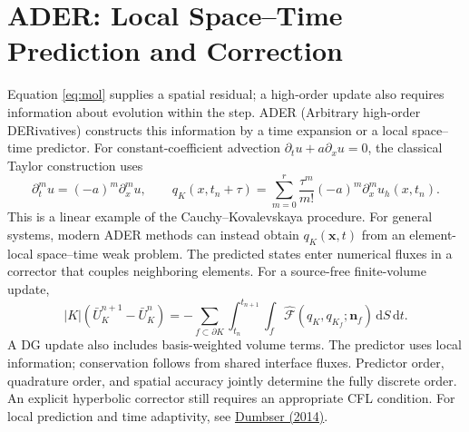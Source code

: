 \documentclass[11pt,openany]{book}
\numberwithin{equation}{chapter}
\theoremstyle{definition}
\theoremstyle{remark}
\newcommand{\dd}{\mathrm d}
\begin{document}
\section{ADER: Local Space--Time Prediction and Correction}\label{sec:ader}
Equation \eqref{eq:mol} supplies a spatial residual; a high-order update also requires information about evolution within the step.
ADER (Arbitrary high-order DERivatives) constructs this information by a time expansion or a local space--time predictor.
For constant-coefficient advection $\partial_tu+a\partial_xu=0$, the classical Taylor construction uses
\begin{equation}\label{eq:ader-taylor}
\partial_t^m u=(-a)^m\partial_x^m u,\qquad
q_K(x,t_n+\tau)=\sum_{m=0}^{r}
\frac{\tau^m}{m!}(-a)^m\partial_x^m u_h(x,t_n).
\end{equation}
This is a linear example of the Cauchy--Kovalevskaya procedure. For general systems, modern ADER methods can instead obtain $q_K(\bm x,t)$ from an element-local space--time weak problem.
The predicted states enter numerical fluxes in a corrector that couples neighboring elements.
For a source-free finite-volume update,
\begin{equation}\label{eq:ader-corrector}
|K|(\bar U_K^{n+1}-\bar U_K^n)
=-\sum_{f\subset\partial K}\int_{t_n}^{t_{n+1}}\int_f
\widehat{\mathcal F}(q_K,q_{K_f};\bm n_f)\,\dd S\,\dd t.
\end{equation}
A DG update also includes basis-weighted volume terms. The predictor uses local information; conservation follows from shared interface fluxes.
Predictor order, quadrature order, and spatial accuracy jointly determine the fully discrete order.
An explicit hyperbolic corrector still requires an appropriate CFL condition. For local prediction and time adaptivity, see
\href{https://doi.org/10.1016/j.cma.2014.07.019}{Dumbser (2014)}.
\end{document}
